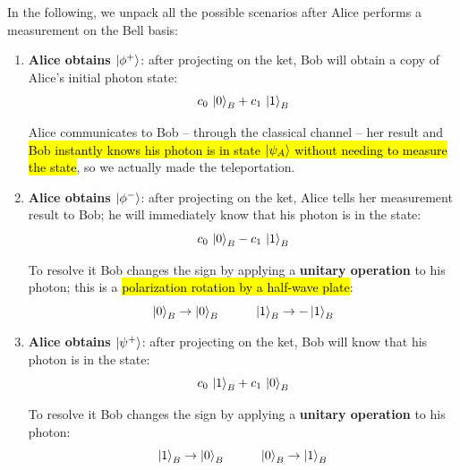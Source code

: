 In the following, we unpack all the possible scenarios after Alice performs a measurement on the Bell basis:
\begin{enumerate}
    \item \textbf{Alice obtains $\ket{\phi^+}$}: after projecting on the ket, Bob will obtain a copy of Alice's initial photon state:
    \begin{equation}\label{eqn:16-bob-state-alice-phi-plus}
        c_0\, \ket{0}_B+c_1\, \ket{1}_B
    \end{equation}

    Alice communicates to Bob -- through the classical channel -- her result and \hl{Bob instantly knows his photon is in state $\ket{\psi_A}$ without needing to measure the state}, so we actually made the teleportation.

    \item \textbf{Alice obtains $\ket{\phi^-}$}: after projecting on the ket, Alice tells her measurement result to Bob; he will immediately know that his photon is in the state:
    \begin{equation}\label{eqn:16-bob-state-alice-phi-minus}
        c_0\, \ket{0}_B-c_1\, \ket{1}_B
    \end{equation}

    To resolve it Bob changes the sign by applying a \textbf{unitary operation} to his photon; this is a \hl{polarization rotation by a half-wave plate}:
    \begin{equation}\label{eqn:16-bob-state-alice-phi-minus-transformation}
        \ket{0}_B \to \ket{0}_B \hspace{1cm} \ket{1}_B \to -\ket{1}_B
    \end{equation}
    
    \item \textbf{Alice obtains $\ket{\psi^+}$}: after projecting on the ket, Bob will know that his photon is in the state:
    \begin{equation}\label{eqn:16-bob-state-alice-psi-plus}
        c_0\, \ket{1}_B+c_1\, \ket{0}_B
    \end{equation}

    To resolve it Bob changes the sign by applying a \textbf{unitary operation} to his photon:
    \begin{equation}\label{eqn:16-bob-state-alice-psi-plus-transformation}
        \ket{1}_B \to \ket{0}_B \hspace{1cm} \ket{0}_B \to \ket{1}_B
    \end{equation}


\end{enumerate}
